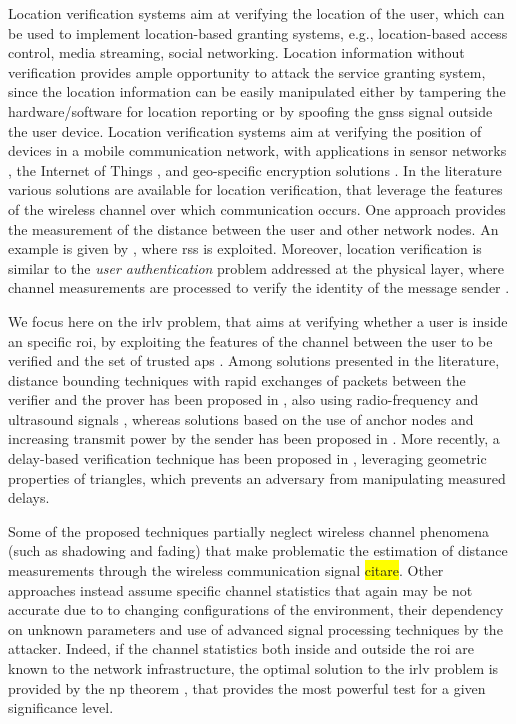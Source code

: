 \documentclass[draftcls,onecolumn,12pt]{IEEEtran}
\begin{document}
Location verification systems aim at verifying the location of the user, which can be used to implement location-based granting systems, e.g., location-based access control, media streaming, social networking. Location information without verification provides ample opportunity to attack the service granting system, since the location information can be easily manipulated either by tampering the hardware/software for location reporting or by spoofing the \ac{gnss} signal outside the user device. Location verification systems aim at verifying the position of devices in a mobile communication network, with applications in sensor networks \cite{Zeng-survey, 8376254, wei2013}, the Internet of Things \cite{7903611}, and geo-specific encryption solutions \cite{quaglia}. In the literature various solutions are available for location verification, that leverage the features of the wireless channel over which communication occurs. One approach provides the measurement of the distance between the user and other network nodes. An example is given by \cite{yan2016location}, where \ac{rss} is exploited. Moreover, location verification is similar to the  {\em user authentication} problem addressed at the physical layer, where  channel measurements are  processed to verify the identity of the message sender \cite{7270404}. 

We focus here on the \ac{irlv} problem, that aims at verifying whether a user is inside an specific \ac{roi}, by exploiting the features of the channel between the user to be verified and the set of trusted \acp{ap} \cite{Zeng-survey}. Among solutions presented in the literature, distance bounding techniques with rapid exchanges of packets between the verifier and the prover has been proposed in \cite{Brands}, also using radio-frequency and ultrasound signals \cite{Sastry}, whereas solutions based on the use of anchor nodes and increasing transmit power by the sender has been proposed in \cite{Vora}. More recently, a delay-based verification technique has been proposed  in \cite{7145434}, leveraging geometric properties of triangles, which prevents an adversary from manipulating measured delays.  

Some of the proposed techniques partially neglect wireless channel phenomena (such as shadowing and fading) that make  problematic the estimation of distance measurements through the wireless communication signal \colorbox{yellow}{citare}. Other approaches instead assume specific channel statistics \cite{quaglia} that again may be not accurate due to to changing configurations of the environment, their dependency on unknown parameters and use of advanced signal processing techniques by the attacker. Indeed, if the channel statistics both inside and outside the \ac{roi} are known to the network infrastructure, the optimal solution to the \ac{irlv} problem is provided by the \ac{np} theorem \cite{Cover-book}, that provides the most powerful test for a given significance level. 
\end{document}
